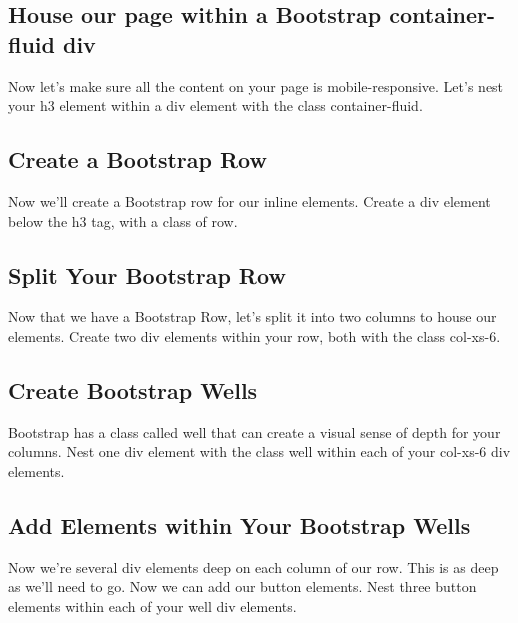 \documentclass{article}%
\begin{document}
%
\subsection{House our page within a Bootstrap container{-}fluid div}%
\label{subsec:HouseourpagewithinaBootstrapcontainer{-}fluiddiv}%
Now let's make sure all the content on your page is mobile{-}responsive.\newline%
Let's nest your h3 element within a div element with the class container{-}fluid.\newline%

%
\subsection{Create a Bootstrap Row}%
\label{subsec:CreateaBootstrapRow}%
Now we'll create a Bootstrap row for our inline elements.\newline%
Create a div element below the h3 tag, with a class of row.\newline%

%
\subsection{Split Your Bootstrap Row}%
\label{subsec:SplitYourBootstrapRow}%
Now that we have a Bootstrap Row, let's split it into two columns to house our elements.\newline%
Create two div elements within your row, both with the class col{-}xs{-}6.\newline%

%
\subsection{Create Bootstrap Wells}%
\label{subsec:CreateBootstrapWells}%
Bootstrap has a class called well that can create a visual sense of depth for your columns.\newline%
Nest one div element with the class well within each of your col{-}xs{-}6 div elements.\newline%

%
\subsection{Add Elements within Your Bootstrap Wells}%
\label{subsec:AddElementswithinYourBootstrapWells}%
Now we're several div elements deep on each column of our row. This is as deep as we'll need to go. Now we can add our button elements.\newline%
Nest three button elements within each of your well div elements.\newline%
\end{document}
